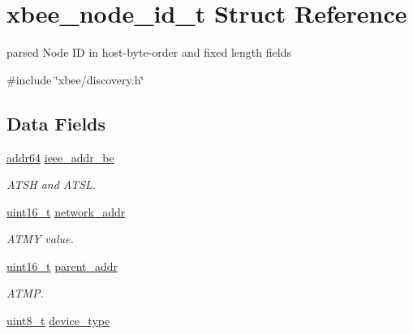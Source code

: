 \hypertarget{structxbee__node__id__t}{\section{xbee\-\_\-node\-\_\-id\-\_\-t Struct Reference}
\label{structxbee__node__id__t}
}


parsed Node I\-D in host-\/byte-\/order and fixed length fields  




{\ttfamily \#include \char`\"{}xbee/discovery.\-h\char`\"{}}

\subsection*{Data Fields}
\begin{DoxyCompactItemize}
\item 
\hypertarget{group__xbee__discovery_ga719f89263ecae9f127dc655c1c14fdac}{\hyperlink{unionaddr64}{addr64} \hyperlink{group__xbee__discovery_ga719f89263ecae9f127dc655c1c14fdac}{ieee\-\_\-addr\-\_\-be}}\label{group__xbee__discovery_ga719f89263ecae9f127dc655c1c14fdac}

\begin{DoxyCompactList}\small\item\em A\-T\-S\-H and A\-T\-S\-L. \end{DoxyCompactList}\item 
\hypertarget{group__xbee__discovery_gac1fa8be8752da585fe6a567d4732c147}{\hyperlink{group__hal_ga5a8b2dc9e45a9ee81a94ef304fb62505}{uint16\-\_\-t} \hyperlink{group__xbee__discovery_gac1fa8be8752da585fe6a567d4732c147}{network\-\_\-addr}}\label{group__xbee__discovery_gac1fa8be8752da585fe6a567d4732c147}

\begin{DoxyCompactList}\small\item\em A\-T\-M\-Y value. \end{DoxyCompactList}\item 
\hypertarget{group__xbee__discovery_ga300e014f0c31d08adc1145613e0b0f72}{\hyperlink{group__hal_ga5a8b2dc9e45a9ee81a94ef304fb62505}{uint16\-\_\-t} \hyperlink{group__xbee__discovery_ga300e014f0c31d08adc1145613e0b0f72}{parent\-\_\-addr}}\label{group__xbee__discovery_ga300e014f0c31d08adc1145613e0b0f72}

\begin{DoxyCompactList}\small\item\em A\-T\-M\-P. \end{DoxyCompactList}\item 
\hypertarget{group__xbee__discovery_gab9c960832b7e834e6657e0c6ab4c3d8a}{\hyperlink{group__hal_gae1affc9ca37cfb624959c866a73f83c2}{uint8\-\_\-t} \hyperlink{group__xbee__discovery_gab9c960832b7e834e6657e0c6ab4c3d8a}{device\-\_\-type}}\label{group__xbee__discovery_gab9c960832b7e834e6657e0c6ab4c3d8a}


\end{DoxyCompactItemize}
